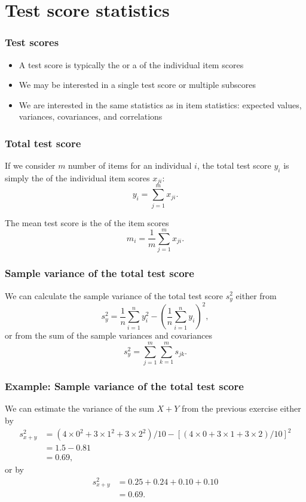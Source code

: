 \documentclass[compress]{beamer}\usepackage[]{graphicx}\usepackage[]{xcolor}
\begin{document}
\section{Test score statistics}

\begin{frame}[fragile]
  \frametitle{Test scores}
    \begin{itemize}
      \item A test score is typically the  or a  of the individual item scores
      \item We may be interested in a single test score or multiple subscores
      \item We are interested in the same statistics as in item statistics: expected values, variances,  covariances, and correlations
    \end{itemize}
\end{frame}


\begin{frame}[fragile]
  \frametitle{Total test score}
    If we consider $m$ number of items for an individual $i$, the total test score $y_i$ is simply the  of the individual item scores $x_{ji}$:
      \[ y_i = \sum_{j=1}^mx_{ji}. \]

    The mean test score is the  of the item scores
    \[ m_i = \frac{1}{m} \sum_{j=1}^m x_{ji}. \]
\end{frame}


\begin{frame}[fragile]
  \frametitle{Sample variance of the total test score}
    We can calculate the sample variance of the total test score $s_y^2$ either from
      \[ s_y^2 = \frac{1}{n} \sum_{i=1}^n y_i^2 - \left( \frac{1}{n} \sum_{i=1}^n y_i \right)^2, \]
    or from the sum of the sample variances and covariances
      \[ s_y^2 = \sum_{j = 1}^m \sum_{k = 1}^ms_{jk}. \]
\end{frame}


\begin{frame}[fragile]
  \frametitle{Example: Sample variance of the total test score}
    We can estimate the variance of the sum $X+Y$ from the previous exercise either by
    \begin{equation*}
      \begin{aligned}
        s_{x+y}^2 &= (4 \times 0^2 + 3 \times 1^2 + 3\times 2^2) / 10 -  [(4\times 0 + 3 \times 1 + 3\times 2) / 10]^2 \\
                  &= 1.5 - 0.81 \\
                  &= 0.69,
      \end{aligned}
    \end{equation*}
    or by
    \begin{align*}
    s_{x+y}^2 &= 0.25 + 0.24 + 0.10 + 0.10 \\
    &= 0.69.
    \end{align*}
\end{frame}
\end{document}
